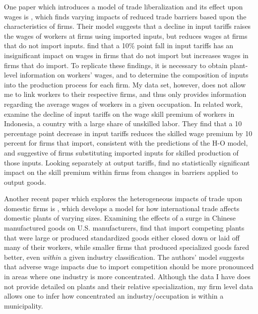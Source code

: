 One paper which introduces a model of trade liberalization and its effect upon wages is \citet{amiti},
which finds varying impacts of reduced trade barriers based upon the characteristics of
firms. Their model suggests that a decline in input tariffs raises the wages of workers at firms
using imported inputs, but reduces wages at firms that do not import inputs. 
\citeauthor{amiti} find that a 10\% point fall in input tariffs has an insignificant impact
on wages in firms that do not import but increases wages in firms that do import. 
To replicate these findings, it is necessary to obtain plant-level information on workers'
wages, and to determine the composition of inputs into the production process for each firm.
My data set, however, does not allow me to link workers to their respective firms, and thus only
provides information regarding the average wages of workers in a given occupation. 
In related work, \citet{amiti2012trade} examine the decline of input tariffs on the wage skill
premium of workers in Indonesia, a country with a large share of unskilled labor.
They find that a 10 percentage point decrease in input tariffs reduces the skilled wage premium
by 10 percent for firms that import, consistent with the predictions of the H-O model, and suggestive
of firms substituting imported inputs for skilled production of those inputs. Looking separately at
output tariffs, \citeauthor{amiti2012trade} find no statistically significant impact on the 
skill premium within firms from changes in barriers applied to output goods.

Another recent paper which explores the heterogeneous impacts of trade upon domestic firms is 
\citet{holmes1}, which develops a model for how international trade affects domestic plants of varying sizes. 
Examining the effects of a surge in Chinese manufactured goods on U.S. manufacturers,
\citeauthor{holmes1} find that import competing plants that were large or produced standardized goods 
either closed down or laid off many of their workers, while smaller firms that produced specialized 
goods fared better, even \textit{within} a given industry classification. The authors' 
model suggests that adverse wage impacts due to import competition should be more pronounced in 
areas where one industry is more concentrated. Although the data I have does not provide detailed
on plants and their relative specialization, my firm level data allows one to infer how concentrated an
industry/occupation is within a municipality.


